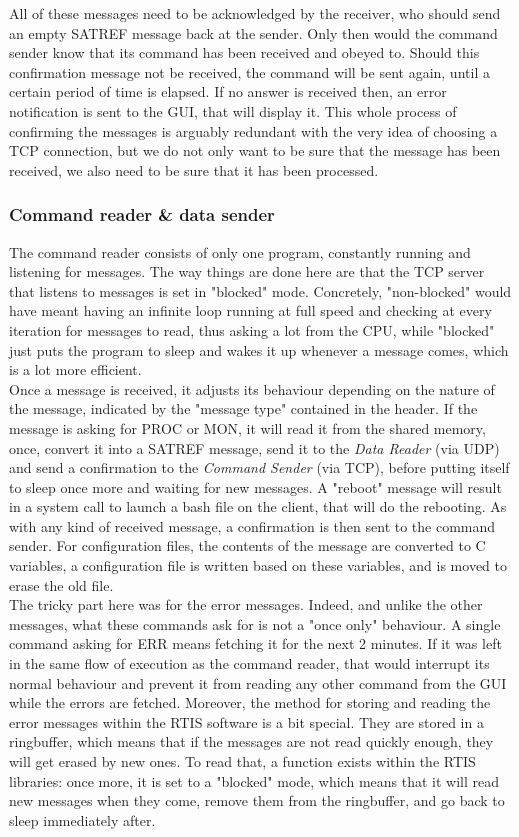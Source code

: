 \documentclass{themeensg}
\begin{document}
All of these messages need to be acknowledged by the receiver, who should send an empty SATREF message back at the sender. Only then would the command sender know that its command has been received and obeyed to. Should this confirmation message not be received, the command will be sent again, until a certain period of time is elapsed. If no answer is received then, an error notification is sent to the GUI, that will display it. This whole process of confirming the messages is arguably redundant with the very idea of choosing a TCP connection, but we do not only want to be sure that the message has been received, we also need to be sure that it has been processed.

\subsubsection{Command reader \& data sender}

The command reader consists of only one program, constantly running and listening for messages. The way things are done here are that the TCP server that listens to messages is set in "blocked" mode. Concretely, "non-blocked" would have meant having an infinite loop running at full speed and checking at every iteration for messages to read, thus asking a lot from the CPU, while "blocked" just puts the program to sleep and wakes it up whenever a message comes, which is a lot more efficient.\\

Once a message is received, it adjusts its behaviour depending on the nature of the message, indicated by the "message type" contained in the header. If the message is asking for PROC or MON, it will read it from the shared memory, once, convert it into a SATREF message, send it to the \textit{Data Reader} (via UDP) and send a confirmation to the \textit{Command Sender} (via TCP), before putting itself to sleep once more and waiting for new messages.
A "reboot" message will result in a system call to launch a bash file on the client, that will do the rebooting. As with any kind of received message, a confirmation is then sent to the command sender.
For configuration files, the contents of the message are converted to C variables, a configuration file is written based on these variables, and is moved to erase the old file.\\

The tricky part here was for the error messages. Indeed, and unlike the other messages, what these commands ask for is not a "once only" behaviour. A single command asking for ERR means fetching it for the next 2 minutes. If it was left in the same flow of execution as the command reader, that would interrupt its normal behaviour and prevent it from reading any other command from the GUI while the errors are fetched.
Moreover, the method for storing and reading the error messages within the RTIS software is a bit special. They are stored in a ringbuffer, which means that if the messages are not read quickly enough, they will get erased by new ones. To read that, a function exists within the RTIS libraries: once more, it is set to a "blocked" mode, which means that it will read new messages when they come, remove them from the ringbuffer, and go back to sleep immediately after.
\end{document}
